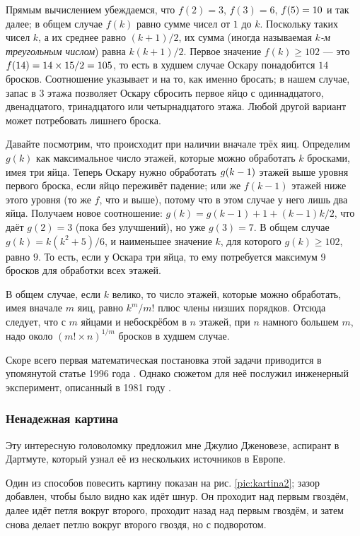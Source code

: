 Прямым вычислением убеждаемся, что $f(2) = 3$, $f(3) = 6$, $f(5) \z= 10$ и так далее; в общем случае $f(k)$ равно сумме чисел от $1$ до $k$.
Поскольку таких чисел $k$, а их среднее равно $(k + 1)/2$, их сумма (иногда называемая \emph{$k$-м треугольным числом}) равна $k(k + 1)/2$.
Первое значение $f(k)\ge 102$ --- это $f(14) \z= 14 \times 15/2 \z= 105$, то есть в худшем случае Оскару понадобится $14$ бросков.
Соотношение указывает и на то, как именно бросать;
в нашем случае, запас в 3 этажа позволяет Оскару сбросить первое яйцо с одиннадцатого, двенадцатого, тринадцатого или четырнадцатого этажа.
Любой другой вариант может потребовать лишнего броска.

Давайте посмотрим, что происходит при наличии вначале трёх яиц.
Определим $g(k)$ как максимальное число этажей, которые можно обработать $k$ бросками, имея три яйца.
Теперь Оскару нужно обработать $g(k \z- 1)$ этажей выше уровня первого броска, если яйцо переживёт падение;
или же $f(k - 1)$ этажей ниже этого уровня (то же $f$, что и выше), потому что в этом случае у него лишь два яйца.
Получаем новое соотношение: $g(k) = g(k-1) + 1 + (k - 1)k/2$, что даёт $g(2) = 3$ (пока без улучшений), но уже $g(3) = 7$.
В общем случае $g(k)=k(k^2+5)/6$, и наименьшее значение $k$, для которого $g(k)\ge 102$, равно $9$.
То есть, если у Оскара три яйца, то ему потребуется максимум 9 бросков для обработки всех этажей.

В общем случае, если $k$ велико, то число этажей, которые можно обработать, имея вначале $m$ яиц, равно $k^m/m!$ плюс члены низших порядков.
Отсюда следует, что с $m$ яйцами и небоскрёбом в $n$ этажей, при $n$ намного большем $m$, надо около $(m!\times n)^{1/m}$ бросков в худшем случае.

\begin{addedbytheeditors}
Скоре всего первая математическая постановка этой задачи приводится в упомянутой статье 1996 года \cite{42}.
Однако сюжетом для неё послужил инженерный эксперимент, описанный в 1981 году \cite{cowan1982design}.\pr
\end{addedbytheeditors}

\subsubsection*{Ненадежная картина}

Эту интересную головоломку предложил мне Джулио Дженовезе, аспирант в Дартмуте, который узнал её из нескольких источников в Европе.

Один из способов повесить картину показан на рис. \ref{pic:kartina2};
зазор добавлен, чтобы было видно как идёт шнур.
Он проходит над первым гвоздём,
далее идёт петля вокруг второго,
проходит назад над первым гвоздём,
и затем снова делает петлю вокруг второго гвоздя, но с подворотом.

